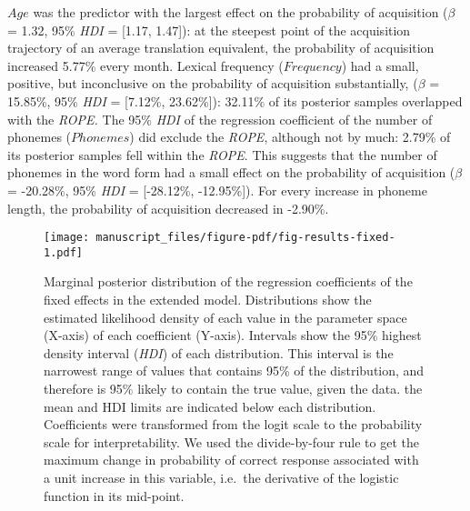 \documentclass[
  letterpaper,
  DIV=11,
  numbers=noendperiod]{scrartcl}
\begin{document}
\(Age\) was the predictor with the largest effect on the probability of
acquisition (\(\beta\) = 1.32, 95\% \emph{HDI} = {[}1.17, 1.47{]}): at
the steepest point of the acquisition trajectory of an average
translation equivalent, the probability of acquisition increased 5.77\%
every month. Lexical frequency (\(Frequency\)) had a small, positive,
but inconclusive on the probability of acquisition substantially,
(\(\beta\) = 15.85\%, 95\% \emph{HDI} = {[}7.12\%, 23.62\%{]}): 32.11\%
of its posterior samples overlapped with the \emph{ROPE.} The 95\%
\emph{HDI} of the regression coefficient of the number of phonemes
(\(Phonemes\)) did exclude the \emph{ROPE}, although not by much: 2.79\%
of its posterior samples fell within the \emph{ROPE}. This suggests that
the number of phonemes in the word form had a small effect on the
probability of acquisition (\(\beta\) = -20.28\%, 95\% \emph{HDI} =
{[}-28.12\%, -12.95\%{]}). For every increase in phoneme length, the
probability of acquisition decreased in -2.90\%.

\begin{figure}

{\centering \texttt{[image: manuscript\_files/figure-pdf/fig-results-fixed-1.pdf]}

}

\caption{\label{fig-results-fixed}Marginal posterior distribution of the
regression coefficients of the fixed effects in the extended model.
Distributions show the estimated likelihood density of each value in the
parameter space (X-axis) of each coefficient (Y-axis). Intervals show
the 95\% highest density interval (\emph{HDI}) of each distribution.
This interval is the narrowest range of values that contains 95\% of the
distribution, and therefore is 95\% likely to contain the true value,
given the data. the mean and HDI limits are indicated below each
distribution. Coefficients were transformed from the logit scale to the
probability scale for interpretability. We used the divide-by-four rule
to get the maximum change in probability of correct response associated
with a unit increase in this variable, i.e.~the derivative of the
logistic function in its mid-point.}

\end{figure}
\end{document}
